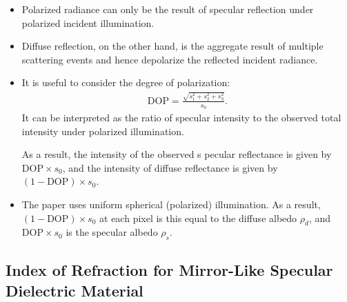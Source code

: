 \documentclass[10pt]{article}
\begin{document}
    \begin{itemize}
      \item Polarized radiance can only be the result of specular reflection under polarized incident illumination.

      \item Diffuse reflection, on the other hand, is the aggregate result of multiple scattering events and hence depolarize the reflected incident radiance.

      \item It is useful to consider the degree of polarization:
      \begin{align*}
        \mathrm{DOP} = \frac{\sqrt{s_1^2 + s_2^2 + s_3^2}}{s_0}.
      \end{align*}
      It can be interpreted as the ratio of specular intensity to the observed total intensity under polarized illumination.

      As a result, the intensity of the observed s pecular reflectance is given by $\mathrm{DOP} \times s_0$, and the intensity of diffuse reflectance is given by $(1 - \mathrm{DOP}) \times s_0$.

      \item The paper uses uniform spherical (polarized) illumination.  As a result, $(1 - \mathrm{DOP}) \times s_0$ at each pixel is this equal to the diffuse albedo $\rho_d$, and $\mathrm{DOP} \times s_0$ is the specular albedo $\rho_s$.      
    \end{itemize}

    \subsection{Index of Refraction for Mirror-Like Specular Dielectric Material}
\end{document}
